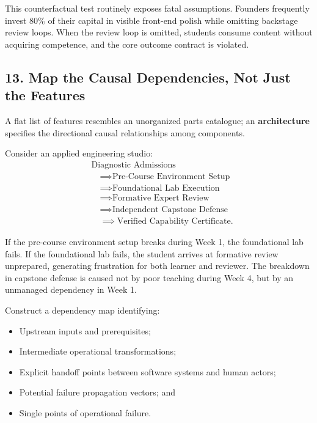 This counterfactual test routinely exposes fatal assumptions. Founders frequently invest 80\% of their capital in visible front-end polish while omitting backstage review loops. When the review loop is omitted, students consume content without acquiring competence, and the core outcome contract is violated.

\subsection*{13. Map the Causal Dependencies, Not Just the Features}

A flat list of features resembles an unorganized parts catalogue; an \textbf{architecture} specifies the directional causal relationships among components.

Consider an applied engineering studio:
\begin{equation}
\begin{aligned}
&\text{Diagnostic Admissions} \\
&\quad \implies \text{Pre-Course Environment Setup} \\
&\quad \implies \text{Foundational Lab Execution} \\
&\quad \implies \text{Formative Expert Review} \\
&\quad \implies \text{Independent Capstone Defense} \\
&\quad \implies \text{Verified Capability Certificate}.
\end{aligned}
\end{equation}

If the pre-course environment setup breaks during Week 1, the foundational lab fails. If the foundational lab fails, the student arrives at formative review unprepared, generating frustration for both learner and reviewer. The breakdown in capstone defense is caused not by poor teaching during Week 4, but by an unmanaged dependency in Week 1.

Construct a dependency map identifying:
\begin{itemize}
    \item Upstream inputs and prerequisites;
    \item Intermediate operational transformations;
    \item Explicit handoff points between software systems and human actors;
    \item Potential failure propagation vectors; and
    \item Single points of operational failure.
\end{itemize}

